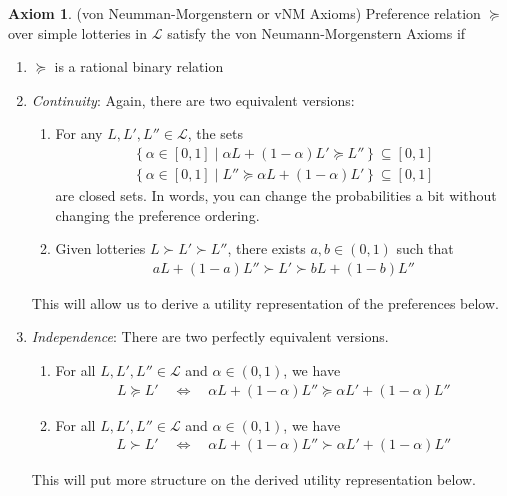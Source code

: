 \documentclass[12pt]{article}
\theoremstyle{plain}
\theoremstyle{definition}
\newtheorem{ax}[thm]{Axiom}
\theoremstyle{remark}
\newcommand{\calL}{\mathcal{L}}
\begin{document}
\begin{ax}(von Neumman-Morgenstern or vNM Axioms)
\label{ax:vNM}
Preference relation $\succeq$ over simple lotteries in $\calL$ satisfy
the von Neumann-Morgenstern Axioms if
\begin{enumerate}
  \item $\succeq$ is a rational binary relation
  \item \emph{Continuity}: Again, there are two equivalent versions:
    \begin{enumerate}
      \item For any $L,L',L''\in\calL$, the sets
        \begin{align*}
          \left\{ \alpha \in[0,1] \;|\;
            \alpha L + (1-\alpha)L' \succeq L'' \right\}
            \subseteq [0,1]\\
          \left\{ \alpha \in[0,1] \;|\;
            L'' \succeq \alpha L + (1-\alpha)L' \right\}
            \subseteq [0,1]
        \end{align*}
        are closed sets. In words, you can change the probabilities a
        bit without changing the preference ordering.
      \item Given lotteries $L\succ L' \succ L''$, there exists
        $a,b\in(0,1)$ such that
        \begin{align*}
          aL + (1-a)L'' \succ L' \succ bL +(1-b)L''
        \end{align*}
    \end{enumerate}
    This will allow us to derive a utility representation of the
    preferences below.

  \item \emph{Independence}: There are two perfectly equivalent
    versions.
    \begin{enumerate}
      \item For all $L,L',L''\in\calL$ and $\alpha\in(0,1)$, we have
        \begin{align*}
          L \succeq L'
          \quad\iff\quad
          \alpha L + (1-\alpha)L'' \succeq \alpha L' + (1-\alpha) L''
        \end{align*}
      \item For all $L,L',L''\in\calL$ and $\alpha\in(0,1)$, we have
        \begin{align*}
          L \succ L'
          \quad\iff\quad
          \alpha L + (1-\alpha)L'' \succ \alpha L' + (1-\alpha) L''
        \end{align*}
    \end{enumerate}
    This will put more structure on the derived utility representation
    below.
\end{enumerate}
\end{ax}
\end{document}
